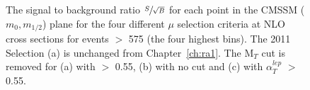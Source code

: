 \begin{figure}[htbp]
\centering
{}
\caption{\label{fig:4sb}The signal to background ratio $\sfrac{S}{\sqrt{B}}$ for each point in the CMSSM ($m_{0},m_{1/2}$) plane for the four different $\mu$ selection criteria at NLO cross sections for events \HT $>$ 575 (the four highest bins). The 2011 Selection (a) is unchanged from Chapter~\ref{ch:ra1}. The M$_{T}$ cut is removed for (a) with \alt $>$ 0.55, (b) with no \alt cut and (c) with $\alpha^{lep}_{T}$ $>$ 0.55.}
\end{figure}





